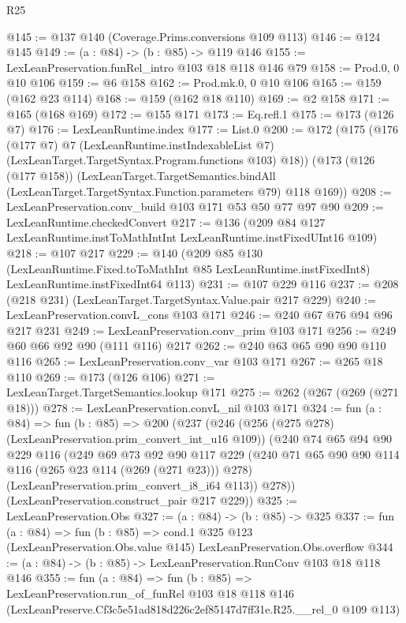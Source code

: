 \begin{lexlean}{R25}
\begin{coremodule}
@145 := @137 @140 (Coverage.Prims.conversions @109 @113)
@146 := @124 @145
@149 := (a : @84) -> (b : @85) -> @119 @146
@155 := LexLeanPreservation.funRel_intro @103 @18 @118 @146 @79
@158 := Prod.{0, 0} @10 @106
@159 := @6 @158
@162 := Prod.mk.{0, 0} @10 @106
@165 := @159 (@162 @23 @114)
@168 := @159 (@162 @18 @110)
@169 := @2 @158
@171 := @165 (@168 @169)
@172 := @155 @171
@173 := Eq.refl.{1}
@175 := @173 (@126 @7)
@176 := LexLeanRuntime.index
@177 := List.{0}
@200 := @172
    (@175
      (@176
        (@177 @7)
        @7
        (LexLeanRuntime.instIndexableList @7)
        (LexLeanTarget.TargetSyntax.Program.functions @103)
        @18))
    (@173
      (@126 (@177 @158))
      (LexLeanTarget.TargetSemantics.bindAll
        (LexLeanTarget.TargetSyntax.Function.parameters @79)
        @118
        @169))
@208 := LexLeanPreservation.conv_build @103 @171 @53 @50 @77 @97 @90
@209 := LexLeanRuntime.checkedConvert
@217 := @136 (@209 @84 @127 LexLeanRuntime.instToMathIntInt LexLeanRuntime.instFixedUInt16 @109)
@218 := @107 @217
@229 := @140
    (@209
      @85
      @130
      (LexLeanRuntime.Fixed.toToMathInt @85 LexLeanRuntime.instFixedInt8)
      LexLeanRuntime.instFixedInt64
      @113)
@231 := @107 @229 @116
@237 := @208 (@218 @231) (LexLeanTarget.TargetSyntax.Value.pair @217 @229)
@240 := LexLeanPreservation.convL_cons @103 @171
@246 := @240 @67 @76 @94 @96 @217 @231
@249 := LexLeanPreservation.conv_prim @103 @171
@256 := @249 @60 @66 @92 @90 (@111 @116) @217
@262 := @240 @63 @65 @90 @90 @110 @116
@265 := LexLeanPreservation.conv_var @103 @171
@267 := @265 @18 @110
@269 := @173 (@126 @106)
@271 := LexLeanTarget.TargetSemantics.lookup @171
@275 := @262 (@267 (@269 (@271 @18)))
@278 := LexLeanPreservation.convL_nil @103 @171
@324 := fun (a : @84) =>
  fun (b : @85) =>
  @200
    (@237
      (@246
        (@256 (@275 @278) (LexLeanPreservation.prim_convert_int_u16 @109))
        (@240
          @74
          @65
          @94
          @90
          @229
          @116
          (@249
            @69
            @73
            @92
            @90
            @117
            @229
            (@240 @71 @65 @90 @90 @114 @116 (@265 @23 @114 (@269 (@271 @23))) @278)
            (LexLeanPreservation.prim_convert_i8_i64 @113))
          @278))
      (LexLeanPreservation.construct_pair @217 @229))
@325 := LexLeanPreservation.Obs
@327 := (a : @84) -> (b : @85) -> @325
@337 := fun (a : @84) =>
  fun (b : @85) =>
  cond.{1} @325 @123 (LexLeanPreservation.Obs.value @145) LexLeanPreservation.Obs.overflow
@344 := (a : @84) -> (b : @85) -> LexLeanPreservation.RunConv @103 @18 @118 @146
@355 := fun (a : @84) =>
  fun (b : @85) =>
  LexLeanPreservation.run_of_funRel
    @103
    @18
    @118
    @146
    (LexLeanPreserve.Cf3c5e51ad818d226c2ef85147d7ff31e.R25.__rel_0 @109 @113)
\end{coremodule}
\end{lexlean}
